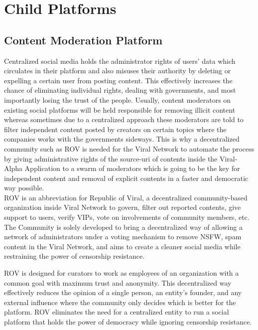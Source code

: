 \documentclass[10pt]{article}
\begin{document}
\section{Child Platforms}

\subsection{Content Moderation Platform}


Centralized social media holds the administrator rights of users’ data which circulates in their platform and also misuses their authority by deleting or expelling a certain user from posting content. This effectively increases the chance of eliminating individual rights, dealing with governments, and most importantly losing the trust of the people. Usually, content moderators on existing social platforms will be held responsible for removing illicit content whereas sometimes due to a centralized approach these moderators are told to filter independent content posted by creators on certain topics where the companies works with the governments sideways. This is why a decentralized community such as ROV is needed for the Viral Network to automate the process by giving administrative rights of the source-uri of contents inside the Viral-Alpha Application to a swarm of moderators which is going to be the key for independent content and removal of explicit contents in a faster and democratic way possible.\\

ROV is an abbreviation for Republic of Viral, a decentralized community-based organization inside Viral Network to govern, filter out reported contents, give support to users, verify VIPs, vote on involvements of community members, etc. The Community is solely developed to bring a decentralized way of allowing a network of administrators under a voting mechanism to remove NSFW, spam content in the Viral Network, and aims to create a cleaner social media while restraining the power of censorship resistance. 

ROV is designed for curators to work as employees of an organization with a common goal with maximum trust and anonymity. This decentralized way effectively reduces the opinion of a single person, an entity’s founder, and any external influence where the community only decides which is better for the platform. ROV eliminates the need for a centralized entity to run a social platform that holds the power of democracy while ignoring censorship resistance. \\
\end{document}
